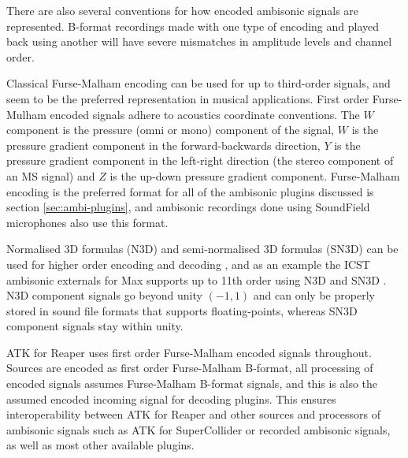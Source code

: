\documentclass{article}
\begin{document}
There are also several conventions for how encoded ambisonic signals are represented.
B-format recordings made with one type of encoding and played back using another will have severe mismatches in amplitude levels and channel order.

Classical Furse-Malham encoding can be used for up to third-order signals, and seem to be the preferred representation in musical applications.
First order Furse-Mulham encoded signals adhere to acoustics coordinate conventions.
The $W$ component is the pressure (omni or mono) component of the signal, $W$ is the pressure gradient component in the forward-backwards direction, $Y$ is the pressure gradient component in the left-right direction (the stereo component of an MS signal) and $Z$ is the up-down pressure gradient component.
Furse-Malham encoding is the preferred format for all of the ambisonic plugins discussed is section \ref{sec:ambi-plugins}, and ambisonic recordings done using SoundField microphones also use this format.

Normalised 3D formulas (N3D) and semi-normalised 3D formulas (SN3D) can be used for higher order encoding and decoding  \cite{daniel:2001phd}, and as an example the ICST ambisonic externals for Max supports up to 11th order using N3D and SN3D \cite{schacher2010:seven}.
N3D component signals go beyond unity $(-1, 1)$ and can only be properly stored in sound file formats that supports floating-points, whereas SN3D component signals stay within unity. 

ATK for Reaper uses first order Furse-Malham encoded signals throughout.
Sources are encoded as first order Furse-Malham B-format, all processing of encoded signals assumes Furse-Malham B-format signals, and this is also the assumed encoded incoming signal for decoding plugins.
This ensures interoperability between ATK for Reaper and other sources and processors of ambisonic signals such as ATK for SuperCollider or recorded ambisonic signals, as well as most other available plugins.
\end{document}
